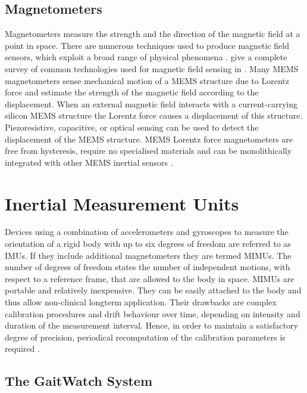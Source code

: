 \subsection{Magnetometers}

Magnetometers measure the strength and the direction of the magnetic field at a point in space. There are numerous techniques used to produce magnetic field sensors, which exploit a broad range of physical phenomena \cite{lenz_magnetic_2006}. \citeauthor{lenz_magnetic_2006} give a complete survey of common technologies used for magnetic field sensing in \cite{lenz_magnetic_2006}. Many \gls{MEMS} magnetometers sense mechanical motion of a MEMS structure due to Lorentz force and estimate the strength of the magnetic field according to the displacement. When an external magnetic field interacts with a current-carrying silicon MEMS structure the Lorentz force causes a displacement of this structure. Piezoresistive, capacitive, or optical sensing can be used to detect the displacement of the MEMS structure. MEMS Lorentz force magnetometers are free from hysteresis, require no specialised materials and can be monolithically integrated with other MEMS inertial sensors \cite{thompson_lorentz_2011}.

\section{Inertial Measurement Units}

Devices using a combination of accelerometers and gyroscopes to measure the orientation of a rigid body with up to six degrees of freedom are referred to as \glspl{IMU}. If they include additional magnetometers they are termed \glspl{MIMU}. The number of degrees of freedom states the number of independent motions, with respect to a reference frame, that are allowed to the body in space. \glspl{MIMU} are portable and relatively inexpensive. They can be easily attached to the body and thus allow non-clinical longterm application. Their drawbacks are complex calibration procedures and drift behaviour over time, depending on intensity and duration of the measurement interval. Hence, in order to maintain a satisfactory degree of precision, periodical recomputation of the calibration parameters is required \cite{olivares_vicente_signal_2013}.

\subsection{The GaitWatch System}

